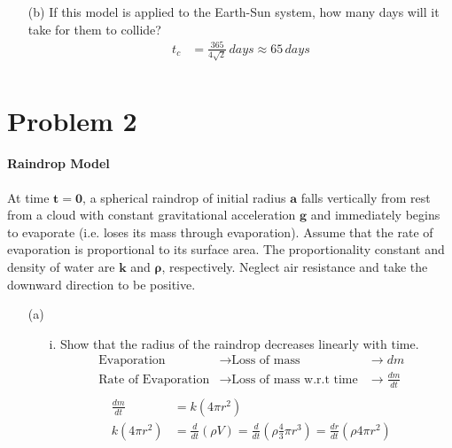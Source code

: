 \documentclass[]{article}
\begin{document}
{\begin{enumerate}
			\item[(b)] If this model is applied to the Earth-Sun system, how many days will it take for them to collide?
				\begin{equation*}
					\begin{split}
						t_c &= \frac{365}{4 \sqrt{2}} \, days \approx 65 \, days  \\
					\end{split}
				\end{equation*}
		\end{enumerate}
	
	\clearpage
	
	\section*{Problem 2}
		\paragraph{Raindrop Model} At time $\bm{t=0}$, a spherical raindrop of initial radius $\bm{a}$ falls vertically from rest from a cloud with constant gravitational acceleration $\bm{g}$ and immediately begins to evaporate (i.e. loses its mass through evaporation). Assume that the rate of evaporation is proportional to its surface area. The proportionality constant and density of water are $\bm{k}$ and $\bm{\rho}$, respectively. Neglect air resistance and take the downward direction to be positive.
		\begin{enumerate}
			\item[(a)]
				\begin{enumerate}
					\item[i.] Show that the radius of the raindrop decreases linearly with time.
						\begin{equation*}
							\begin{aligned}
								\text{Evaporation} &\to \text{Loss of mass} &\to dm \\
								\text{Rate of Evaporation} &\to \text{Loss of mass w.r.t time} &\to \frac{dm}{dt} \\
							\end{aligned}
						\end{equation*}
						\begin{equation*}
							\begin{split}
								\frac{dm}{dt} &= k(4\pi r^2) \\
								 k(4\pi r^2) &= \frac{d}{dt}(\rho V) =  \frac{d}{dt}(\rho \frac{4}{3} \pi r^3) = \frac{dr}{dt}(\rho 4 \pi r^2) \\

\end{split}
\end{equation*}
\end{enumerate}
\end{enumerate}}
\end{document}
